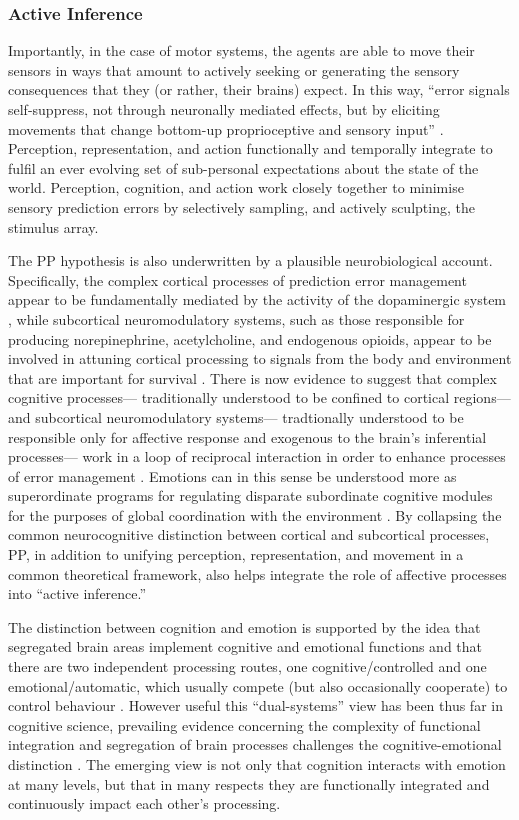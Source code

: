 \subsubsection{Active Inference}
Importantly, in the case of motor systems, the agents are able to move their sensors in ways that amount to actively seeking or generating the sensory consequences that they (or rather, their brains) expect.  In this way, ``error signals self-suppress, not through neuronally mediated effects, but by eliciting movements that change bottom-up proprioceptive and sensory input'' \citep[186]{Clark2013}. Perception, representation, and action functionally and temporally integrate to fulfil an ever evolving set of sub-personal expectations about the state of the world.  Perception, cognition, and action work closely together to minimise sensory prediction errors by selectively sampling, and actively sculpting, the stimulus array.

The PP hypothesis is also underwritten by a plausible neurobiological account. Specifically, the complex cortical processes of prediction error management appear to be fundamentally mediated by the activity of the dopaminergic system \citep{Schultz2016}, while subcortical neuromodulatory systems, such as those responsible for producing norepinephrine, acetylcholine, and endogenous opioids, appear to be involved in attuning cortical processing to signals from the body and environment that are important for survival \citep{Lewis2005}.  There is now evidence to suggest that complex cognitive processes--- traditionally understood to be confined to cortical regions--- and subcortical neuromodulatory systems--- tradtionally understood to be responsible only for affective response and exogenous to the brain's inferential processes--- work in a loop of reciprocal interaction in order to enhance processes of error management \citep{Damasio1994,Lewis2005,Miller2017,Barrett2017}.
Emotions can in this sense be understood more as superordinate programs for regulating disparate subordinate cognitive modules for the purposes of global coordination with the environment \citep{Cosmides2000}.  By collapsing the common neurocognitive distinction between cortical and subcortical processes, PP, in addition to unifying perception, representation, and movement in a common theoretical framework, also helps integrate the role of affective processes into ``active inference.''

The distinction between cognition and emotion is supported by the idea that segregated brain areas implement cognitive and emotional functions and that there are two independent processing routes, one cognitive/controlled and one emotional/automatic, which usually compete (but also occasionally cooperate) to control behaviour \citep{Kahneman2003}.  However useful this ``dual-systems'' view has been thus far in cognitive science, prevailing evidence concerning the complexity of functional integration and segregation of brain processes challenges the cognitive-emotional distinction \citep{Pessoa2013}.  The emerging view is not only that cognition interacts with emotion at many levels, but that in many respects they are functionally integrated and continuously impact each other's processing.


